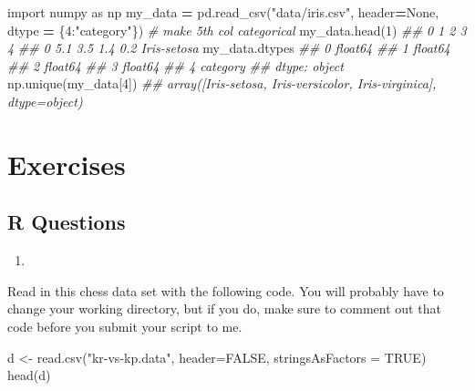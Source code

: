 \documentclass[
  12pt,
  krantz2]{krantz}
\makeatletter
\newenvironment{Shaded}{\begin{snugshade}}{\end{snugshade}}
\newcommand{\AttributeTok}[1]{\textcolor[rgb]{0.61,0.61,0.61}{#1}}
\newcommand{\CommentTok}[1]{\textcolor[rgb]{0.37,0.37,0.37}{\textit{#1}}}
\newcommand{\ConstantTok}[1]{\textcolor[rgb]{0,0,0}{#1}}
\newcommand{\DecValTok}[1]{\textcolor[rgb]{0.06,0.06,0.06}{#1}}
\newcommand{\FunctionTok}[1]{\textcolor[rgb]{0,0,0}{#1}}
\newcommand{\ImportTok}[1]{#1}
\newcommand{\NormalTok}[1]{#1}
\newcommand{\OperatorTok}[1]{\textcolor[rgb]{0.43,0.43,0.43}{\textbf{#1}}}
\newcommand{\OtherTok}[1]{\textcolor[rgb]{0.37,0.37,0.37}{#1}}
\newcommand{\StringTok}[1]{\textcolor[rgb]{0.5,0.5,0.5}{#1}}
\newcommand{\VariableTok}[1]{\textcolor[rgb]{0,0,0}{#1}}
\providecommand{\tightlist}{%
  \setlength{\itemsep}{0pt}\setlength{\parskip}{0pt}}
\newenvironment{kframe}{%
\medskip{}
\setlength{\fboxsep}{.8em}
 \def\at@end@of@kframe{}%
 \ifinner\ifhmode%
  \def\at@end@of@kframe{\end{minipage}}%
  \begin{minipage}{\columnwidth}%
 \fi\fi%
 \def\FrameCommand##1{\hskip\@totalleftmargin \hskip-\fboxsep
 \colorbox{shadecolor}{##1}\hskip-\fboxsep
     \hskip-\linewidth \hskip-\@totalleftmargin \hskip\columnwidth}%
 \MakeFramed {\advance\hsize-\width
   \@totalleftmargin\z@ \linewidth\hsize
   \@setminipage}}%
 {\par\unskip\endMakeFramed%
 \at@end@of@kframe}
\renewenvironment{Shaded}{\begin{kframe}}{\end{kframe}}
\makeatother
\begin{document}
\begin{Shaded}
\begin{Highlighting}[]
\ImportTok{import}\NormalTok{ numpy }\ImportTok{as}\NormalTok{ np}
\NormalTok{my\_data }\OperatorTok{=}\NormalTok{ pd.read\_csv(}\StringTok{"data/iris.csv"}\NormalTok{, header}\OperatorTok{=}\VariableTok{None}\NormalTok{, }
\NormalTok{                      dtype }\OperatorTok{=}\NormalTok{ \{}\DecValTok{4}\NormalTok{:}\StringTok{"category"}\NormalTok{\}) }\CommentTok{\# make 5th col categorical}
\NormalTok{my\_data.head(}\DecValTok{1}\NormalTok{)}
\CommentTok{\#\#      0    1    2    3            4}
\CommentTok{\#\# 0  5.1  3.5  1.4  0.2  Iris{-}setosa}
\NormalTok{my\_data.dtypes}
\CommentTok{\#\# 0     float64}
\CommentTok{\#\# 1     float64}
\CommentTok{\#\# 2     float64}
\CommentTok{\#\# 3     float64}
\CommentTok{\#\# 4    category}
\CommentTok{\#\# dtype: object}
\NormalTok{np.unique(my\_data[}\DecValTok{4}\NormalTok{])}
\CommentTok{\#\# array([\textquotesingle{}Iris{-}setosa\textquotesingle{}, \textquotesingle{}Iris{-}versicolor\textquotesingle{}, \textquotesingle{}Iris{-}virginica\textquotesingle{}], dtype=object)}
\end{Highlighting}
\end{Shaded}

\hypertarget{exercises-5}{%
\section{Exercises}\label{exercises-5}}

\hypertarget{r-questions-5}{%
\subsection{R Questions}\label{r-questions-5}}

\begin{enumerate}
\def\labelenumi{\arabic{enumi}.}
\tightlist
\item
\end{enumerate}

Read in this chess data set \citep{misc_chess} with the following code. You will probably have to change your working directory, but if you do, make sure to comment out that code before you submit your script to me.

\begin{Shaded}
\begin{Highlighting}[]
\NormalTok{d }\OtherTok{\textless{}{-}} \FunctionTok{read.csv}\NormalTok{(}\StringTok{"kr{-}vs{-}kp.data"}\NormalTok{, }\AttributeTok{header=}\ConstantTok{FALSE}\NormalTok{, }\AttributeTok{stringsAsFactors =} \ConstantTok{TRUE}\NormalTok{)}
\FunctionTok{head}\NormalTok{(d)}
\end{Highlighting}
\end{Shaded}
\end{document}
